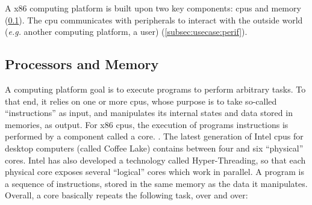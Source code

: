 A x86 computing platform is built upon two key components: \acp{cpu} and memory
(\ref{subsec:usecase:cpumem}).
%
The \ac{cpu} communicates with peripherals to interact with the outside world
(\emph{e.g.} another computing platform, a user) (\ref{subsec:usecase:perif}).

\subsection{Processors and Memory}
\label{subsec:usecase:cpumem}

A computing platform goal is to execute programs to perform arbitrary tasks.
%
To that end, it relies on one or more \acp{cpu}, whose purpose is to take
so-called ``instructions'' as input, and manipulates its internal states and
data stored in memories, as output.
%
For x86 \acp{cpu}, the execution of programs instructions is performed by a
component called a core. .
%
The latest generation of Intel \acp{cpu} for desktop computers (called Coffee
Lake) contains between four and six ``physical'' cores.
%
Intel has also developed a technology called Hyper-Threading, so
that each physical core exposes several ``logical'' cores which work in
parallel.
%
A program is a sequence of instructions, stored in the same memory as the data
it manipulates.
%
Overall, a core basically repeats the following task, over and over:

